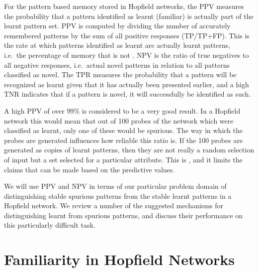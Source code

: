 For the pattern based memory stored in Hopfield networks, the PPV measures the probability that a pattern identified as learnt (familiar) is actually part of the learnt pattern set. PPV is computed by dividing the number of accurately remembered patterns by the sum of all positive responses (TP/TP+FP).  This is the rate at which patterns identified as learnt are actually learnt patterns, i.e.\ the percentage of memory that is not \dejavu. NPV is the ratio of true negatives to all negative responses, i.e.\ actual novel patterns in relation to all patterns classified as novel.  The TPR measures the probability that a pattern will be recognized as learnt given that it has actually been presented earlier, and a high TNR indicates that if a pattern is novel, it will successfully be identified as such. 

A high PPV of over 99\% is considered to be a very good result.  In a Hopfield network this would mean that out of 100 probes of the network which were classified as learnt, only one of these would be spurious. The way in which the probes are generated influences how reliable this ratio is.  If the 100 probes are generated as copies of learnt patterns, then they are not really a random selection of input but a set selected for a particular attribute.  This is , and it limits the claims that can be made based on the predictive values.


We will use PPV and NPV in terms of our particular problem domain of distinguishing stable spurious patterns from the stable learnt patterns in a Hopfield network. We review a number of the suggested mechanisms for distinguishing learnt from spurious patterns, and discuss their performance on this particularly difficult task.


\section{Familiarity in Hopfield Networks}
\label{sec:existingSolutionsFamiliarity}

